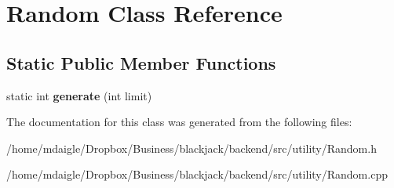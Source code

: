 \hypertarget{classRandom}{
\section{\-Random \-Class \-Reference}
\label{classRandom}
}
\subsection*{\-Static \-Public \-Member \-Functions}
\begin{DoxyCompactItemize}
\item 
\hypertarget{classRandom_ade56a1f0cea6fbf8f445e4f6faa10eff}{
static int {\bfseries generate} (int limit)}
\label{classRandom_ade56a1f0cea6fbf8f445e4f6faa10eff}

\end{DoxyCompactItemize}


\-The documentation for this class was generated from the following files\-:\begin{DoxyCompactItemize}
\item 
/home/mdaigle/\-Dropbox/\-Business/blackjack/backend/src/utility/\-Random.\-h\item 
/home/mdaigle/\-Dropbox/\-Business/blackjack/backend/src/utility/\-Random.\-cpp\end{DoxyCompactItemize}

